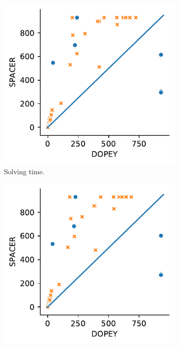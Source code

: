 \begin{figure}[t]
\begin{subfigure}[b]{0.48\textwidth}
    \includegraphics[width=0.99\textwidth]{figures/res-dpy_vs_spc_total_inside.pdf}
    \caption{Solving time.}
    \label{subfig:dpy_vs_spc_total_sub}
  \end{subfigure}
  \begin{subfigure}[b]{0.48\textwidth}
  \centering
    \includegraphics[width=0.99\textwidth]{figures/res-dpy_vs_spc_smt_solver.pdf}

\end{subfigure}
\end{figure}
